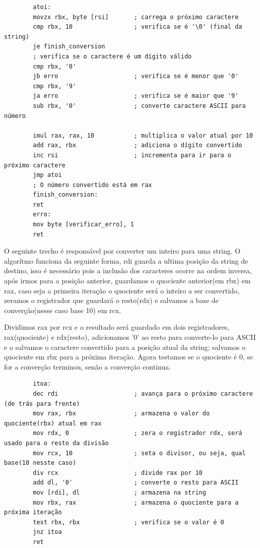 \documentclass[12pt, openany, oneside, a4paper, brazil]{abntex2}
\begin{document}
	\begin{verbatim}
		atoi:
		movzx rbx, byte [rsi]       ; carrega o próximo caractere
		cmp rbx, 10                 ; verifica se é '\0' (final da string)
		je finish_conversion
		; verifica se o caractere é um dígito válido
		cmp rbx, '0'
		jb erro                     ; verifica se é menor que '0'
		cmp rbx, '9'
		ja erro                     ; verifica se é maior que '9'
		sub rbx, '0'                ; converte caractere ASCII para número
		
		imul rax, rax, 10           ; multiplica o valor atual por 10
		add rax, rbx                ; adiciona o dígito convertido
		inc rsi                     ; incrementa para ir para o próximo caractere
		jmp atoi
		; O número convertido está em rax
		finish_conversion:
		ret
		erro:
		mov byte [verificar_erro], 1
		ret
	\end{verbatim}
	
	O seguinte trecho é responsável por converter um inteiro para uma string. O algorítmo funciona da seguinte forma, rdi guarda a ultima posição da string de destino, isso é necessário pois a inclusão dos caracteres ocorre na ordem inversa, após irmos para a posição anterior, guardamos o quociente anterior(em rbx) em rax, caso seja a primeira iteração o quociente será o inteiro a ser convertido, zeramos o registrador que guardará o resto(rdx) e salvamos a base de converção(nesse caso base 10) em rcx.
	
	\noindent Dividimos rax por rcx e o resultado será guardado em dois registradores, rax(quociente) e rdx(resto), adicionamos '0' ao resto para converte-lo para ASCII e o salvamos o caractere convertido para a posição atual da string; salvamos o quociente em rbx para a próxima iteração. Agora testamos se o quociente é 0, se for a converção terminou, senão a converção continua. 
	
	\begin{verbatim}
		itoa:
		dec rdi                     ; avança para o próximo caractere (de trás para frente)
		mov rax, rbx                ; armazena o valor do quociente(rbx) atual em rax
		mov rdx, 0                  ; zera o registrador rdx, será usado para o resto da divisão
		mov rcx, 10                 ; seta o divisor, ou seja, qual base(10 nesste caso)
		div rcx                     ; divide rax por 10
		add dl, '0'                 ; converte o resto para ASCII
		mov [rdi], dl               ; armazena na string
		mov rbx, rax                ; armazena o quociente para a próxima iteração
		test rbx, rbx               ; verifica se o valor é 0
		jnz itoa
		ret
	\end{verbatim}
	
\end{document}
